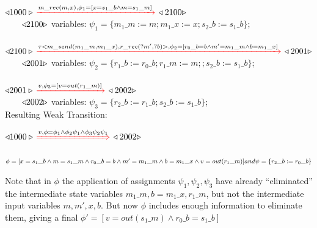 \documentclass{lncs/llncs}
\begin{document}
\noindent
$\triangleleft{1000}\triangleright\textcolor{red}{\,\xrightarrow{\textcolor{black}{m\_rec(m,x), \phi_1 = [x=s_1\_b \land
    m=s_1\_m]}}\,}\triangleleft{2100}\triangleright$\\
$\qquad\triangleleft{2100}\triangleright$ variables: $\psi_1 = \{m_1\_m:=m; m_1\_x:=x; s_2\_b:=s_1\_b\}$;\\
\\
$\triangleleft{2100}\triangleright\textcolor{red}{\,\xrightarrow{\textcolor{black}{\tau <m\_send(m_1\_m,m_1\_x), r\_rec(?m',?b)>,
  \phi_2 = [r_0\_b=b \land m'=m_1\_m \land b=m_1\_x]}}\,}\triangleleft{2001}\triangleright$\\
$\qquad\triangleleft{2001}\triangleright$ variables: $\psi_2 = \{r_1\_b:=r_0\_b; r_1\_m:=m;
; s_2\_b:=s_1\_b\}$;\\
\\
$\triangleleft{2001}\triangleright\textcolor{red}{\,\xrightarrow{\textcolor{black}{v,
  \phi_3 = [v=out(r_1\_m)]}}\,}\triangleleft{2002}\triangleright$\\
$\qquad\triangleleft{2002}\triangleright$ variables: $\psi_3 = \{r_2\_b:=r_1\_b; s_2\_b:=s_1\_b\}$;\\

Resulting Weak Transition:

\noindent
$\ostate{1000}\OTWeakarrow{v,
  \phi = \phi_1\land\phi_2\psi_1\land\phi_3\psi_2\psi_1}\ostate{2002}$\\
\\
$\phi=[x=s_1\_b \land m=s_1\_m\\
  \land r_0\_b=b \land m'=m_1\_m \land b=m_1\_x\\
  \land v=out(r_1\_m)]\\
and \\
\psi= \{r_2\_b:=r_0\_b\}$

Note that in $\phi$ the application of assignments
$\psi_1,\psi_2,\psi_3$ have already ``eliminated'' the intermediate
state variables
$m_1\_m, b=m_1\_x, r_1\_m$, but not the intermediate input variables
$m,m',x,b$. But now $\phi$ includes enough information to eliminate them, giving
a final $\phi'= [v=out(s_1\_m)\land r_0\_b=s_1\_b]$
\end{document}
